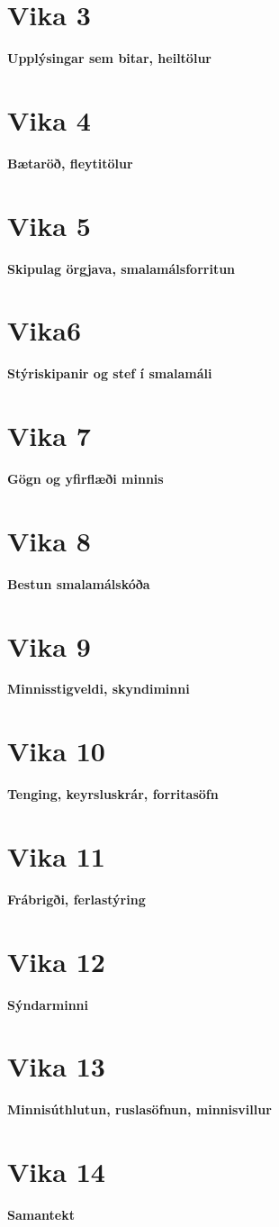 \documentclass{article}
\begin{document}
\section{Vika 3}
\large{\textbf{Upplýsingar sem bitar, heiltölur}}


\section{Vika 4}
\large{\textbf{Bætaröð, fleytitölur}}


\section{Vika 5}
\large{\textbf{Skipulag örgjava, smalamálsforritun}}


\section{Vika6}
\large{\textbf{Stýriskipanir og stef í smalamáli}}


\section{Vika 7}
\large{\textbf{Gögn og yfirflæði minnis}}


\section{Vika 8}
\large{\textbf{Bestun smalamálskóða}}


\section{Vika 9}
\large{\textbf{Minnisstigveldi, skyndiminni}}


\section{Vika 10}
\large{\textbf{Tenging, keyrsluskrár, forritasöfn}}


\section{Vika 11}
\large{\textbf{Frábrigði, ferlastýring}}

\section{Vika 12}
\large{\textbf{Sýndarminni}}

\section{Vika 13}
\large{\textbf{Minnisúthlutun, ruslasöfnun, minnisvillur}}


\section{Vika 14}
\large{\textbf{Samantekt}}
\end{document}
